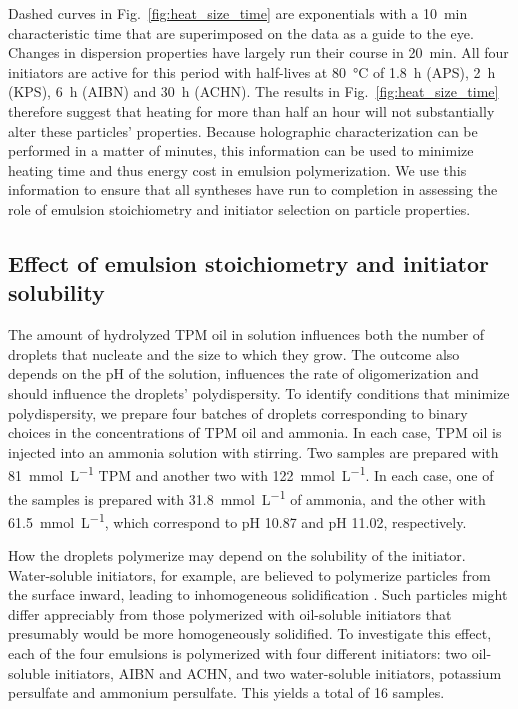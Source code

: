 \documentclass[journal=langd5,manuscript=article]{achemso}
\begin{document}
Dashed curves in Fig.~\ref{fig:heat_size_time}
are exponentials with a \SI{10}{\minute} characteristic
time that are superimposed on the data as a guide
to the eye.
Changes in dispersion properties have largely run
their course in \SI{20}{\minute}.
All four initiators are active for this period with
half-lives at \SI{80}{\degreeCelsius} of \SI{1.8}{\hour}
(APS\cite{borisov2015kinetic}),
\SI{2}{\hour} (KPS\cite{beylerian2002kinetics}), 
\SI{6}{\hour} (AIBN) and \SI{30}{\hour}
(ACHN).
The results in Fig.~\ref{fig:heat_size_time} therefore
suggest that heating for more than half an hour
will not substantially alter these particles'
properties.
Because holographic characterization can be performed
in a matter of minutes, this
information can be used to minimize heating time
and thus energy cost in emulsion polymerization.
We use this information to ensure that all syntheses
have run to completion in assessing the
role of emulsion stoichiometry and initiator
selection on particle properties.

\subsection{Effect of emulsion stoichiometry and
initiator solubility}
\label{sec:stoichiometry}

The amount of hydrolyzed 
TPM oil in solution influences both
the number of droplets that nucleate and
the size to which they grow.
The outcome also depends on the pH of the solution,
influences the rate of oligomerization and should
influence the droplets' polydispersity.
To identify conditions that minimize polydispersity,
we prepare four batches of droplets
corresponding to binary choices in the
concentrations of TPM oil and ammonia.
In each case, TPM oil is injected into an ammonia solution
with stirring.
Two samples are prepared with \SI{81}{\milli\mole\per\liter}
TPM and another two with \SI{122}{\milli\mole\per\liter}.
In each case, one of the samples is prepared 
with \SI{31.8}{\milli\mole\per\liter} of ammonia,
and the other with \SI{61.5}{\milli\mole\per\liter}, which
correspond to pH \num{10.87} and pH \num{11.02}, respectively.

How the droplets polymerize may depend on the
solubility of the initiator.
Water-soluble initiators, for example, are believed
to polymerize particles from the surface inward,
leading to inhomogeneous solidification \cite{sacanna11}.
Such particles might differ appreciably from
those polymerized with oil-soluble initiators
that presumably would be more homogeneously solidified.
To investigate this effect, each of the four
emulsions is polymerized with four different initiators:
two oil-soluble initiators, AIBN and ACHN,
and two water-soluble  initiators, potassium persulfate 
and ammonium persulfate.
This yields a total of \num{16} samples.
\end{document}
